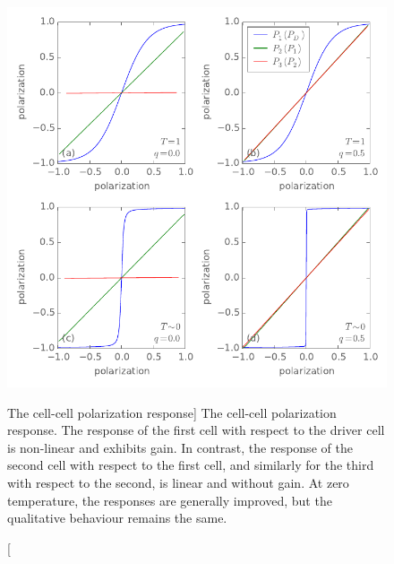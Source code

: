 \begin{figure}
  \center
  \includegraphics{three_cells_PP}
  \caption
  [The cell-cell polarization response]
  {
  The cell-cell polarization response. The response of the first cell with
  respect to the driver cell is non-linear and exhibits gain. In contrast, the
  response of the second cell with respect to the first cell, and similarly
  for the third with respect to the second, is linear and without gain. At zero
  temperature, the responses are generally improved, but the qualitative
  behaviour remains the same.
  }
  \label{fig:three_cells_PP}
\end{figure}

